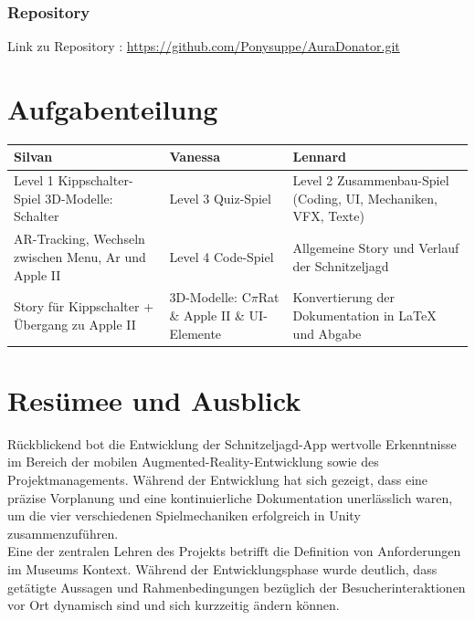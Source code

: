 \subsubsection{Repository}
Link zu Repository : \url{https://github.com/Ponysuppe/AuraDonator.git}

\section{Aufgabenteilung}
\begin{table}[H]
\centering
\begin{tabular}{|p{4.5cm}|p{4.5cm}|p{4.5cm}|}
\hline
\textbf{Silvan} & \textbf{Vanessa} & \textbf{Lennard} \\
\hline
Level 1 Kippschalter-Spiel \newline 3D-Modelle: Schalter & Level 3 Quiz-Spiel & Level 2 Zusammenbau-Spiel \newline (Coding, UI, Mechaniken, VFX, Texte) \\
\hline
AR-Tracking, Wechseln zwischen Menu, Ar und Apple II & Level 4 Code-Spiel & Allgemeine Story und Verlauf der Schnitzeljagd \\
\hline
Story für Kippschalter + Übergang zu Apple II & 3D-Modelle: C$\pi$Rat \& Apple II \& UI-Elemente & Konvertierung der Dokumentation in LaTeX und Abgabe\\
\hline
\end{tabular}
\end{table}

\section{Resümee und Ausblick}
Rückblickend bot die Entwicklung der Schnitzeljagd-App wertvolle Erkenntnisse im Bereich der mobilen Augmented-Reality-Entwicklung sowie des Projektmanagements. Während der Entwicklung hat sich gezeigt, dass eine präzise Vorplanung und eine kontinuierliche Dokumentation unerlässlich waren, um die vier verschiedenen Spielmechaniken erfolgreich in Unity zusammenzuführen.\\ 

Eine der zentralen Lehren des Projekts betrifft die Definition von Anforderungen im Museums Kontext. Während der Entwicklungsphase wurde deutlich, dass getätigte Aussagen und Rahmenbedingungen bezüglich der Besucherinteraktionen vor Ort dynamisch sind und sich kurzzeitig ändern können.\\

